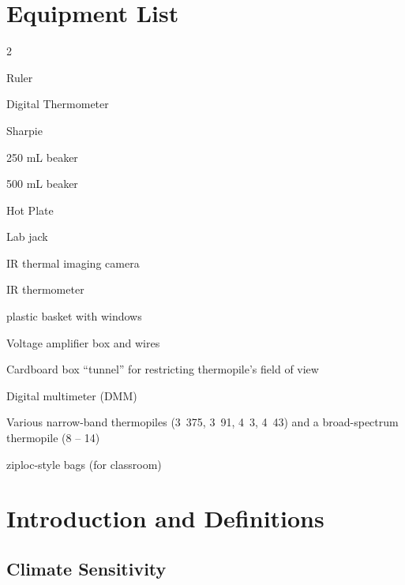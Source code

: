 

\section*{Equipment List}

\begin{multicols}{2}   %
\begin{equipment}
\item Ruler
\item Digital Thermometer
\item Sharpie
\item 250 mL beaker 
\item 500 mL beaker 
\item Hot Plate
\item Lab jack
\item IR thermal imaging camera
\item IR thermometer
\item plastic basket with windows
\item Voltage amplifier box and wires
\item Cardboard box ``tunnel'' for restricting thermopile's field of view
\item Digital multimeter (DMM)
\item Various narrow-band thermopiles (\unit{3.375}{\micro\meter}, \unit{3.91}{\micro\meter}, \unit{4.3}{\micro\meter}, \unit{4.43}{\micro\meter}) and a broad-spectrum thermopile (\unit{8}{\micro\meter} -- \unit{14}{\micro\meter})
\item ziploc-style  bags (for classroom)
\end{equipment}
\end{multicols}


\section{Introduction and Definitions}

\subsection{Climate Sensitivity}

